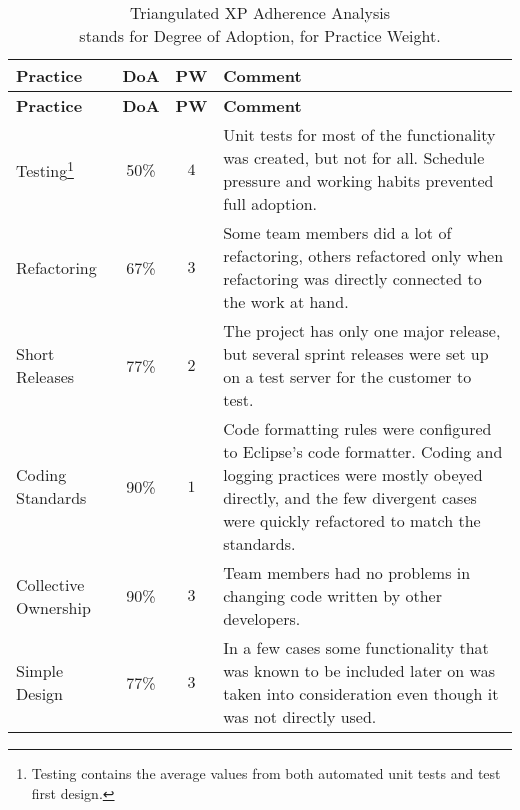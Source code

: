 \begin{center}
\begin{longtable}{|l|c|c|p{7.3cm}|}

\caption[Triangulated XP Adherence Analysis]{Triangulated XP Adherence 
Analysis\\\small{} stands for Degree of Adoption, 
for Practice Weight.} \label{table:evaluation:xpam:triangulated}\\

\hline \textbf{Practice} & \textbf{DoA} & \textbf{PW} & 
\textbf{Comment}\\ \hline \endfirsthead

\hline \textbf{Practice} & \textbf{DoA} & \textbf{PW} & 
\textbf{Comment}\\ \hline \endhead

Testing\footnote{Testing contains the average values from both 
automated unit tests and test first design.} & 50\% & $4$ & Unit tests 
for most of the functionality was created, but not for all. Schedule 
pressure and working habits prevented full adoption.\\ \hline

Refactoring & 67\% & $3$ & Some team members did a lot of refactoring, 
others refactored only when refactoring was directly connected to the 
work at hand.\\ \hline

Short Releases & 77\% & $2$ & The project has only one major release, 
but several sprint releases were set up on a test server for the 
customer to test.\\ \hline

Coding Standards & 90\% & $1$ & Code formatting rules were configured 
to Eclipse's code formatter. Coding and logging practices were mostly 
obeyed directly, and the few divergent cases were quickly refactored 
to match the standards.\\ \hline

Collective Ownership & 90\% & $3$ & Team members had no problems in 
changing code written by other developers.\\ \hline

Simple Design & 77\% & $3$ & In a few cases some functionality that 
was known to be included later on was taken into consideration even 
though it was not directly used.\\ \hline

\end{longtable}
\end{center}

